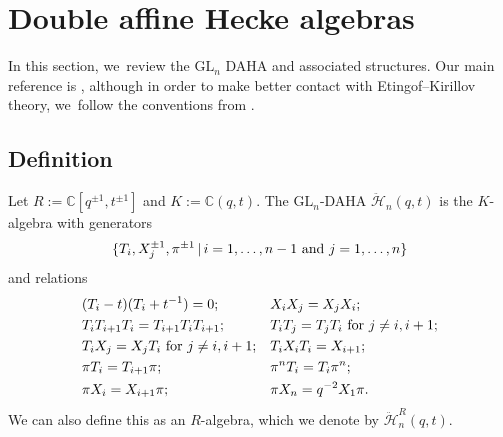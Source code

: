 \documentclass[JEP,XML,SOM,Unicode,published]{cedram}
\newcommand{\GL}{\mathrm{GL}}
\theoremstyle{definition}
\newcommand{\CC}{\mathbb{C}}
\newcommand{\HH}{\ddot{\mathcal{H}}}
\begin{document}
\section{Double affine Hecke algebras}

In this section, we~review the $\GL_n$ DAHA and associated structures.
Our main reference is \cite{ChereDAHA}, although in order to make better contact with Etingof--Kirillov theory, we~follow the conventions from \cite{KirLec}.

\subsection{Definition}
Let $R:=\CC[q^{\pm1},t^{\pm1}]$ and $K:=\CC(q,t)$.
The $\GL_n$-DAHA $\HH_n(q,t)$ is the $K$-algebra with generators
\[
\{T_i,
X_j^{\pm 1},
\pi^{\pm 1}\, |\,i=1,\ldots, n-1\hbox{ and } j=1,\ldots, n\}
\]
and relations
\begin{equation*}
\begin{aligned}
&(T_i-t)(T_i+t^{-1})=0;&&X_iX_j=X_jX_i; \\
&T_iT_{i+1}T_i=T_{i+1}T_iT_{i+1};&& T_iT_j=T_jT_i\hbox{ for }j\not=i, i+1;\\
&T_iX_j=X_jT_i\hbox{ for }j\not=i, i+1; && T_iX_iT_i=X_{i+1}; \\
&\pi T_i=T_{i+1}\pi; && \pi^n T_i=T_i\pi^n;\\
&\pi X_i=X_{i+1}\pi;&& \pi X_n=q^{-2}X_1\pi.
\end{aligned}
\end{equation*}
We can also define this as an $R$-algebra, which we denote by $\HH^R_n(q,t)$.
\end{document}
